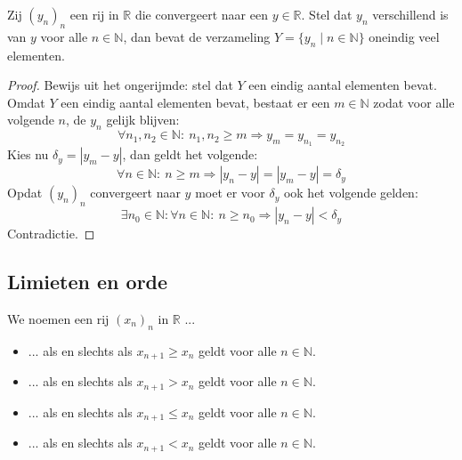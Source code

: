 \documentclass[main.tex]{subfiles}
\begin{document}
\begin{st}
  Zij $(y_{n})_{n}$ een rij in $\mathbb{R}$ die convergeert naar een $y\in \mathbb{R}$.
  Stel dat $y_{n}$ verschillend is van $y$ voor alle $n\in \mathbb{N}$, dan bevat de verzameling $Y = \{y_{n}\mid n\in \mathbb{N}\}$ oneindig veel elementen.

  \begin{proof}
    Bewijs uit het ongerijmde: stel dat $Y$ een eindig aantal elementen bevat.\\
    Omdat $Y$ een eindig aantal elementen bevat, bestaat er een $m\in \mathbb{N}$ zodat voor alle volgende $n$, de $y_{n}$ gelijk blijven:
    \[ \forall n_{1},n_{2}\in \mathbb{N}:\ n_{1},n_{2} \ge m \Rightarrow y_{m} = y_{n_{1}} = y_{n_{2}} \]
    Kies nu $\delta_{y} = |y_{m}-y|$, dan geldt het volgende:
    \[ \forall n\in \mathbb{N}:\ n \ge m \Rightarrow |y_{n}-y| = |y_{m}-y| = \delta_{y} \]
    Opdat $(y_{n})_{n}$ convergeert naar $y$ moet er voor $\delta_{y}$ ook het volgende gelden:
    \[ \exists n_{0} \in \mathbb{N}: \forall n \in \mathbb{N}:\ n \ge n_{0} \Rightarrow |y_{n}-y| < \delta_{y} \]
    Contradictie.
\feed
  \end{proof}
\end{st}

\subsection{Limieten en orde}
\label{sec:limieten-en-orde}


\begin{de}
  We noemen een rij $(x_{n})_{n}$ in $\mathbb{R}$ ...
  \begin{itemize}
  \item ...  als en slechts als $x_{n+1} \ge x_{n}$ geldt voor alle $n\in \mathbb{N}$.  
  \item ...  als en slechts als $x_{n+1} > x_{n}$ geldt voor alle $n\in \mathbb{N}$.  
  \item ...  als en slechts als $x_{n+1} \le x_{n}$ geldt voor alle $n\in \mathbb{N}$.  
  \item ...  als en slechts als $x_{n+1} < x_{n}$ geldt voor alle $n\in \mathbb{N}$.  
  \end{itemize}
\end{de}
\end{document}
